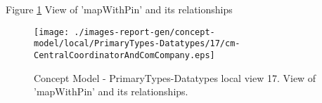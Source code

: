 Figure \ref{fig:lu.uni.lassy.excalibur.group09.spec-CM-view-local-PrimaryTypes-Datatypes-17} View of 'mapWithPin' and its relationships



\begin{figure}[htbp] 
\label{fig:lu.uni.lassy.excalibur.group09.spec-CM}
\begin{center}
\texttt{[image: ./images-report-gen/concept-model/local/PrimaryTypes-Datatypes/17/cm-CentralCoordinatorAndComCompany.eps]}
\end{center}
\caption[Concept Model - PrimaryTypes-Datatypes local view 17 - View of 'mapWithPin' and its relatio]{Concept Model - PrimaryTypes-Datatypes local view 17. View of 'mapWithPin' and its relationships.}
\label{fig:lu.uni.lassy.excalibur.group09.spec-CM-view-local-PrimaryTypes-Datatypes-17}
\end{figure}
\vspace{0.5cm} 
